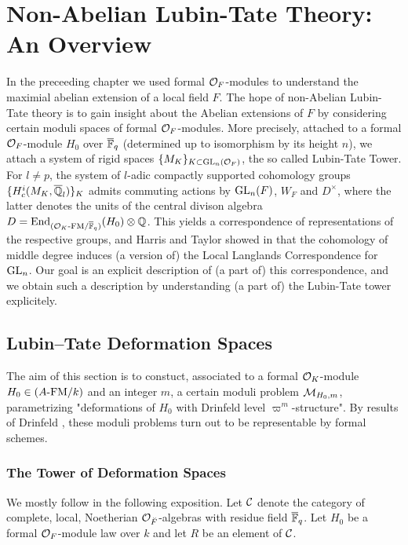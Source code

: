\documentclass[../main.tex]{subfiles}
\begin{document}
\section{Non-Abelian Lubin-Tate Theory: An Overview} %
\label{sec:Non-Abelian Lubin-Tate Theory: An Overview}
In the preceeding chapter we used formal $\mathcal{O}_F$-modules to understand the 
maximial abelian extension of a local field $F$. The hope of non-Abelian Lubin-Tate
theory is to gain insight about the Abelian extensions of $F$ by considering
certain moduli spaces of formal $\mathcal{O}_F$-modules.
More precisely, attached to a formal $\mathcal{O}_F$-module $H_0$ over ${\overline {\mathbb{F}}_q}$ (determined
up to isomorphism by its height $n$), we attach a system of rigid spaces 
$\{M_K\}_{K \subset \operatorname{GL}_n(\mathcal{O}_F)}$, the so called Lubin-Tate Tower. For $l \neq p$, 
the system of $l$-adic compactly supported cohomology groups $\{H_c^{i}(M_K,
\overline {\mathbb{Q}}_l)\}_K$ admits commuting actions by $\operatorname{GL}_n(F)$, $W_F$ and $D^\times$,
where the latter denotes the units of the central divison algebra $D =
\operatorname{End}_{{({\mathcal{O}_K}\text-\allowbreak\mathrm{FM}/{{\overline {\mathbb{F}}_q}})}}(H_0) \otimes \mathbb{Q}$. This yields a correspondence of 
representations of the respective groups, and Harris and Taylor showed in
\cite{HTShimura} that the cohomology of middle degree induces (a version of)
the Local Langlands Correspondence for $\operatorname{GL}_n$. Our goal is an explicit
description of (a part of) this correspondence, and we obtain such a
description by understanding (a part of) the Lubin-Tate tower explicitely.

\subsection{Lubin--Tate Deformation Spaces} %
\label{sub:Lubin-Tate Deformation Spaces}
The aim of this section is to constuct, associated to a formal $\mathcal{O}_K$-module
$H_0 \in {({A}\text-\allowbreak\mathrm{FM}/{k})}$ and an integer $m$, a certain moduli problem $\mathcal{M}_{H_0, m}$,
parametrizing "deformations of $H_0$ with Drinfeld level $\varpi^m$-structure".
By results of Drinfeld \cite{drinfel1974elliptic}, these moduli problems turn
out to be representable by formal schemes. 

\subsubsection{The Tower of Deformation Spaces} %
\label{ssub:The Tower of Deformation Spaces}
We mostly follow \cite[Chapter 2]{Strauch2008DefSp} in the following
exposition. Let $\mathcal{C}$ denote the category of complete, local, Noetherian
$\mathcal{O}_{\breve {F}}$-algebras with residue field $\overline {\mathbb{F}}_q$.
Let $H_0$ be a formal $\mathcal{O}_F$-module law over $k$ and let $R$ be an element of 
$\mathcal{C}$.
\end{document}
